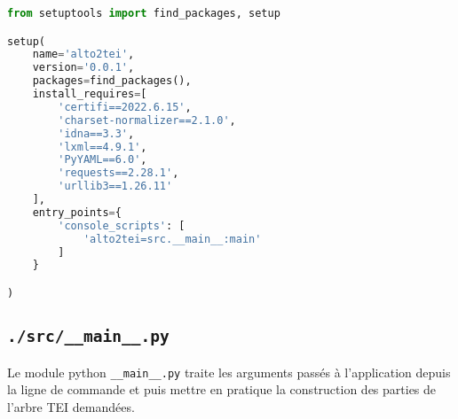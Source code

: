 \documentclass[class=article, crop=false]{standalone}
\begin{document}
\begin{lstlisting}[language=python, style=python]
from setuptools import find_packages, setup

setup(
    name='alto2tei',
    version='0.0.1',
    packages=find_packages(),
    install_requires=[
        'certifi==2022.6.15',
        'charset-normalizer==2.1.0',
        'idna==3.3',
        'lxml==4.9.1',
        'PyYAML==6.0',
        'requests==2.28.1',
        'urllib3==1.26.11'
    ],
    entry_points={
        'console_scripts': [
            'alto2tei=src.__main__:main'
        ]
    }

)
\end{lstlisting}

\subsection{\texttt{./src/\_\_main\_\_.py}}
\label{main.py}
Le module python \texttt{\_\_main\_\_.py} traite les arguments passés à l'application depuis la ligne de commande et puis mettre en pratique la construction des parties de l'arbre \acrshort{TEI} demandées.
\end{document}
